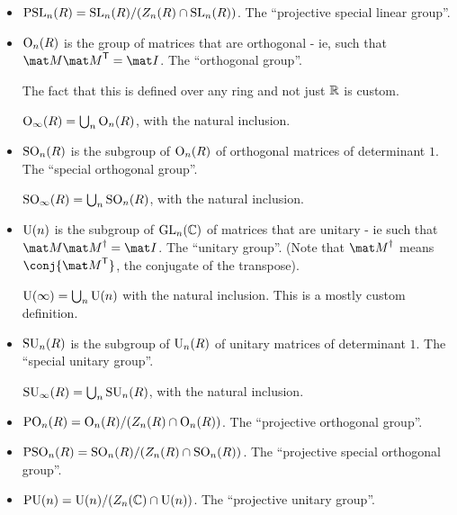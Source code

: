 \documentclass[a4paper,12pt]{article}
\begin{document}
\begin{enumerate}[leftmargin=*]
\begin{itemize}
\begin{itemize}

     \item
      \(\mathrm{PSL}_n(R) = \mathrm{SL}_n(R) / (Z_n(R) \cap \mathrm{SL}_n(R))\).
      The ``projective special linear group''.

     \item
      \(\mathrm{O}_n(R)\) is the group of matrices that are orthogonal -
      ie, such that \(\mat M \tran{\mat M} = \mat I\).
      The ``orthogonal group''.

      The fact that this is defined over any ring and not just \(\mathbb R\) is custom.

      \(\mathrm{O}_\infty(R) = \bigcup_n \mathrm{O}_n(R)\), with the natural inclusion.
     \item
      \(\mathrm{SO}_n(R)\) is the subgroup of \(\mathrm{O}_n(R)\) of orthogonal matrices of
      determinant \(1\). The ``special orthogonal group''.

      \(\mathrm{SO}_\infty(R) = \bigcup_n \mathrm{SO}_n(R)\), with the natural inclusion.
     \item
      \(\mathrm{U}(n)\) is the subgroup of \(\mathrm{GL}_n(\mathbb C)\) of matrices that are unitary -
      ie such that \(\mat M \herm{\mat M} = \mat I\).
      The ``unitary group''. (Note that \(\herm{\mat M}\) means
      \(\conj{\tran{\mat M}}\), the conjugate of the transpose).

      \(\mathrm{U}(\infty) = \bigcup_n \mathrm{U}(n)\) with the natural inclusion. This is a
      mostly custom definition.
     \item
      \(\mathrm{SU}_n(R)\) is the subgroup of \(\mathrm{U}_n(R)\) of unitary matrices of
      determinant \(1\). The ``special unitary group''.

      \(\mathrm{SU}_\infty(R) = \bigcup_n \mathrm{SU}_n(R)\), with the natural inclusion.
     \item
      \(\mathrm{PO}_n(R) = \mathrm{O}_n(R) / (Z_n(R) \cap \mathrm{O}_n(R))\). The ``projective
      orthogonal group''.

     \item
      \(\mathrm{PSO}_n(R) = \mathrm{SO}_n(R) / (Z_n(R) \cap \mathrm{SO}_n(R))\). The ``projective
      special orthogonal group''.

     \item
      \(\mathrm{PU}(n) = \mathrm{U}(n) / (Z_n(\mathbb C) \cap \mathrm{U}(n))\). The ``projective unitary
      group''.


\end{itemize}
\end{itemize}
\end{enumerate}
\end{document}
